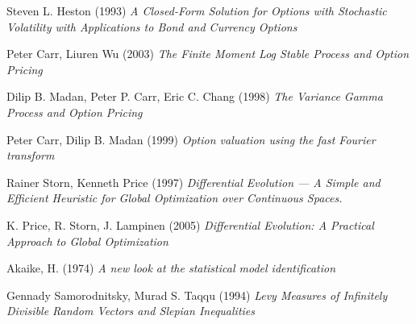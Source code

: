 \documentclass[oneside, final, 12pt, a4paper]{article}
\begin{document}
\newpage
\begin{thebibliography}{00}
 Steven L. Heston (1993)
\emph{A Closed-Form Solution for Options with Stochastic Volatility with Applications to Bond and Currency Options}

 Peter Carr, Liuren Wu (2003)
\emph{The Finite Moment Log Stable Process and Option Pricing}

 Dilip B. Madan, Peter P. Carr, Eric C. Chang (1998)
\emph{The Variance Gamma Process and Option Pricing}

 Peter Carr, Dilip B. Madan (1999)
\emph{Option valuation using the fast Fourier transform}

 Rainer Storn, Kenneth Price (1997)
\emph{Differential Evolution — A Simple and Efficient Heuristic for Global Optimization over Continuous Spaces.}

 K. Price, R. Storn, J. Lampinen (2005)
\emph{Differential Evolution: A Practical Approach to Global Optimization}

 Akaike, H. (1974)
\emph{A new look at the statistical model identification}

 Gennady Samorodnitsky, Murad S. Taqqu (1994)
\emph{Levy Measures of Infinitely Divisible Random Vectors and Slepian Inequalities}

\end{thebibliography}
\end{document}

